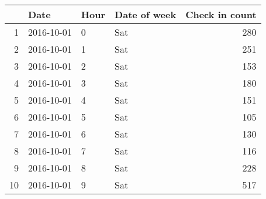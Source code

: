 \begin{tabular}{rlllr}
  & Date & Hour & Date of week & Check in count \\ 
  \hline
\hline
1 & 2016-10-01 & 0 & Sat & 280 \\ 
   \hline
2 & 2016-10-01 & 1 & Sat & 251 \\ 
   \hline
3 & 2016-10-01 & 2 & Sat & 153 \\ 
   \hline
4 & 2016-10-01 & 3 & Sat & 180 \\ 
   \hline
5 & 2016-10-01 & 4 & Sat & 151 \\ 
   \hline
6 & 2016-10-01 & 5 & Sat & 105 \\ 
   \hline
7 & 2016-10-01 & 6 & Sat & 130 \\ 
   \hline
8 & 2016-10-01 & 7 & Sat & 116 \\ 
   \hline
9 & 2016-10-01 & 8 & Sat & 228 \\ 
   \hline
10 & 2016-10-01 & 9 & Sat & 517 \\ 
  \end{tabular}
